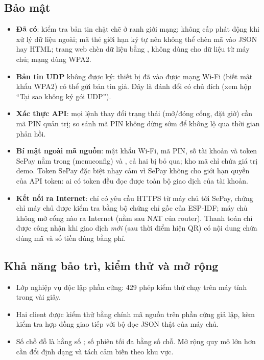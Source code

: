\subsection{Bảo mật}
\begin{itemize}
\item \textbf{Đã có}: kiểm tra bản tin chặt chẽ ở ranh giới mạng; không cấp phát động
  khi xử lý dữ liệu ngoài; mã thẻ giới hạn ký tự nên không thể chèn mã vào JSON hay
  HTML; trang web chèn dữ liệu bằng , không dùng 
  cho dữ liệu từ máy chủ; mạng dùng WPA2.
\item \textbf{Bản tin UDP} không được ký: thiết bị đã vào được mạng Wi-Fi (biết mật khẩu
  WPA2) có thể gửi bản tin giả. Đây là đánh đổi có chủ đích (xem hộp ``Tại sao không ký
  gói UDP'').
\item \textbf{Xác thực API}: mọi lệnh thay đổi trạng thái (mở/đóng cổng, đặt giờ) cần mã
  PIN quản trị; so sánh mã PIN không dừng sớm để không lộ qua thời gian phản hồi.
\item \textbf{Bí mật ngoài mã nguồn}: mật khẩu Wi-Fi, mã PIN, số tài khoản và token
  SePay nằm trong  (menuconfig) và , cả hai bị
   bỏ qua; kho mã chỉ chứa giá trị demo. Token SePay đặc biệt nhạy cảm
  vì SePay không cho giới hạn quyền của API token: ai có token đều đọc được toàn bộ giao
  dịch của tài khoản.
\item \textbf{Kết nối ra Internet}: chỉ có yêu cầu HTTPS từ máy chủ tới SePay, chứng
  chỉ máy chủ được kiểm tra bằng bộ chứng chỉ gốc của ESP-IDF; máy chủ không mở cổng nào
  ra Internet (nằm sau NAT của router). Thanh toán chỉ được công nhận khi giao dịch
  \emph{mới} (sau thời điểm hiện QR) có nội dung chứa đúng mã và số tiền đúng bằng phí.
\end{itemize}

\subsection{Khả năng bảo trì, kiểm thử và mở rộng}
\begin{itemize}
\item Lớp nghiệp vụ độc lập phần cứng: 429 phép kiểm thử chạy trên máy tính trong vài giây.
\item Hai client được kiểm thử bằng chính mã nguồn  trên phần cứng giả lập,
  kèm kiểm tra hợp đồng giao tiếp với bộ đọc JSON thật của máy chủ.
\item Số chỗ đỗ là hằng số ; số phiên tối đa bằng số chỗ.
  Mở rộng quy mô lớn hơn cần đổi định dạng  và tách cảm biến theo khu vực.
\end{itemize}

